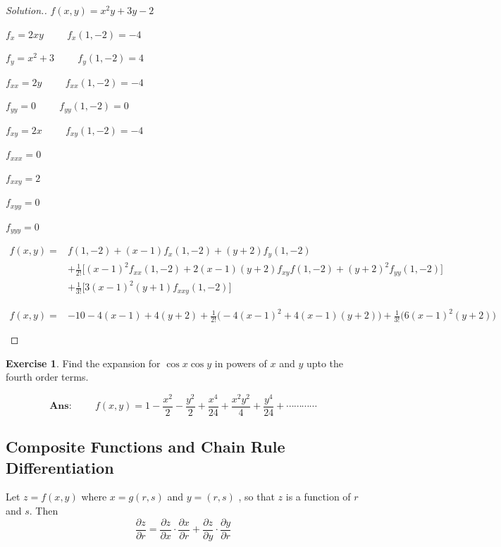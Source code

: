 \documentclass[11pt,a4paper]{article}
\theoremstyle{definition}
\newtheorem{exe}[thm]{Exercise}
\newenvironment{solution}
  {\renewcommand{\qedsymbol}{}\begin{proof}[\textit{Solution}.]}
  {\end{proof}}
\begin{document}
\begin{solution}


$f(x,y) = x^2y + 3y -2$


$f_x = 2xy\hspace{1cm} f_x(1,-2) = -4$


$f_y = x^2 + 3\hspace{1cm} f_y (1,-2) = 4$


$f_{xx} = 2y \hspace{1cm} f_{xx}(1,-2) = -4$


$f_{yy} = 0 \hspace{1cm}  f_{yy} (1,-2) = 0$


$f_{xy} = 2x\hspace{1cm} f_{xy} (1,-2) = -4$


$f_{xxx} = 0$


$f_{xxy} = 2$


$f_{xyy} = 0$


$f_{yyy} = 0$


\begin{align*}
f(x,y) = & f(1,-2) + (x-1)f_x(1,-2) + (y+2)f_y(1,-2)\\ & + \frac{1}{2!}\big[(x-1)^2 f_{xx}(1,-2) + 2(x-1)(y+2)f_{xy}f(1,-2) + (y+2)^2f_{yy}(1,-2)\big]\\
 & + \frac{1}{3!}\big[3(x-1)^2(y+1)f_{xxy}(1,-2)\big]
\end{align*}

\begin{align*}
f(x,y) = & -10 - 4(x-1) + 4(y+2) + \frac{1}{2!}\big(-4(x-1)^2 +4(x - 1) (y+2)\big) + \frac{1}{3!}\big(6(x-1)^2(y+2)\big)\\\\
\end{align*}
\end{solution}

\begin{exe}


Find the expansion for $\cos x \cos y$ in powers of $x$ and $y$ upto the fourth order terms.

$$\textbf{Ans:}\hspace{1cm} f(x,y) = 1 - \frac{x^2}{2}-\frac{y^2}{2} + \frac{x^4}{24} + \frac{x^2y^2}{4} + \frac{y^4}{24}+\cdots\cdots\cdots\cdots$$


\pagebreak
\end{exe}
{\color[wave]{485}\subsection{Composite Functions and Chain Rule Differentiation}}
Let $z = f(x,y)$ where $x = g(r,s)$ and $y = (r,s)$ , so that $z$ is a function of $r$ and $s$. Then $$\frac{\partial z}{\partial r} =\frac{\partial z}{\partial x}\cdot \frac{\partial x}{\partial r} + \frac{\partial z}{\partial y}\cdot \frac{\partial y}{\partial r}$$ 
\end{document}
